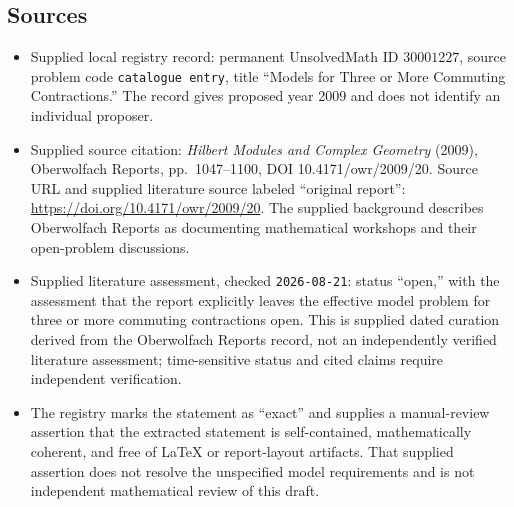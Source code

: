 \documentclass[11pt]{article}
\begin{document}
\subsection{Sources}
\begin{itemize}
\item Supplied local registry record: permanent UnsolvedMath ID \(30001227\), source problem code \texttt{catalogue entry}, title ``Models for Three or More Commuting Contractions.'' The record gives proposed year 2009 and does not identify an individual proposer.
\item Supplied source citation: \emph{Hilbert Modules and Complex Geometry} (2009), Oberwolfach Reports, pp.\ 1047--1100, DOI 10.4171/owr/2009/20. Source URL and supplied literature source labeled ``original report'': \url{https://doi.org/10.4171/owr/2009/20}. The supplied background describes Oberwolfach Reports as documenting mathematical workshops and their open-problem discussions.
\item Supplied literature assessment, checked \texttt{2026-08-21}: status ``open,'' with the assessment that the report explicitly leaves the effective model problem for three or more commuting contractions open. This is supplied dated curation derived from the Oberwolfach Reports record, not an independently verified literature assessment; time-sensitive status and cited claims require independent verification.
\item The registry marks the statement as ``exact'' and supplies a manual-review assertion that the extracted statement is self-contained, mathematically coherent, and free of LaTeX or report-layout artifacts. That supplied assertion does not resolve the unspecified model requirements and is not independent mathematical review of this draft.
\end{itemize}
\end{document}
